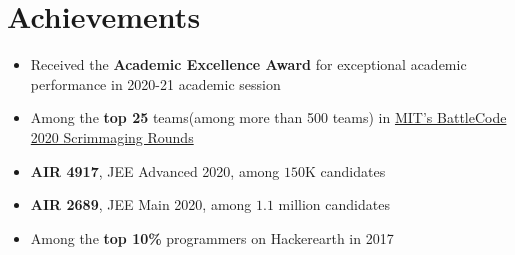 \section*{\sc Achievements}
\vspace{-2mm}
\hrulefill
\vspace{1mm}

\begin{itemize}
    \item Received the \textbf{Academic Excellence Award} for exceptional academic performance in 2020-21 academic session
    \item Among the \textbf{top 25} teams(among more than 500 teams) in  \href{https://github.com/abhishekshree/BattleCode}{MIT's BattleCode 2020 Scrimmaging Rounds}
    \item \textbf{AIR 4917}, JEE Advanced 2020, among $150$K candidates 
    \item \textbf{AIR 2689}, JEE Main 2020, among $1.1$ million candidates
    \item Among the \textbf{top 10\%} programmers on Hackerearth in 2017
\end{itemize}
